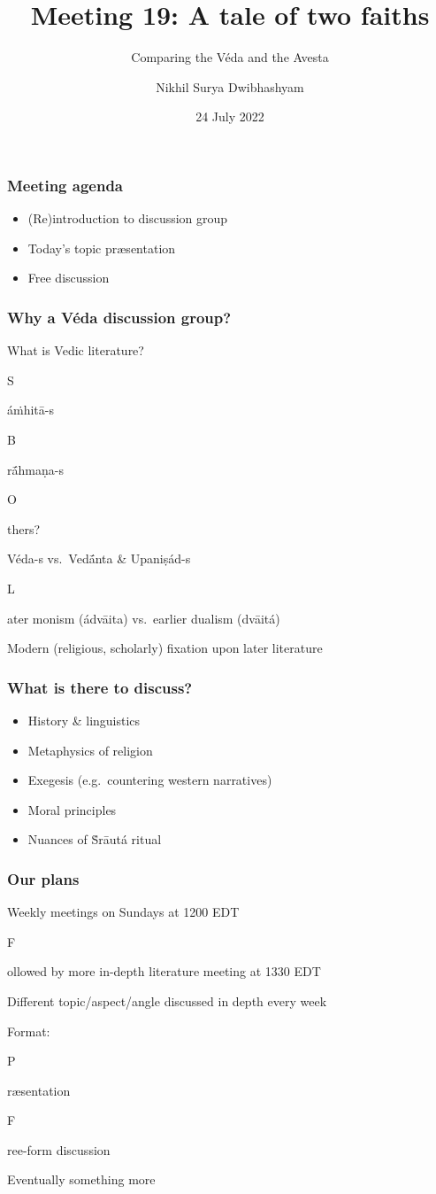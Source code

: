 \documentclass[pdf]{beamer}
\title{Meeting 19: A tale of two faiths}
\subtitle{Comparing the Véda and the Avesta}
\author{Nikhil Surya Dwibhashyam}
\date{24 July 2022}
\newcommand{\Subitem}[1]{{\setlength\itemindent{12pt} \item[-] #1}}
\begin{document}
\frame{\titlepage}

\begin{frame} \frametitle{Meeting agenda}
\begin{itemize}
	\item (Re)introduction to discussion group
	\item Today's topic præsentation
	\item Free discussion
\end{itemize}
\end{frame}

\begin{frame} \frametitle{Why a Véda discussion group?}
\begin{itemize}
	\item What is Vedic literature?
	\Subitem Sáṁhitā-s
	\Subitem Brā́hmaṇa-s
	\Subitem Others?
	\item Véda-s vs.~Vedā́nta \& Upaniṣád-s
	\Subitem Later monism (ádvāita) vs.~earlier dualism (dvāitá)
	\item Modern (religious, scholarly) fixation upon later literature
\end{itemize}
\end{frame}

\begin{frame} \frametitle{What is there to discuss?}
\begin{itemize}
	\item History \& linguistics
	\item Metaphysics of religion
	\item Exegesis (e.g.~countering western narratives)
	\item Moral principles
	\item Nuances of Ṡrāutá ritual
\end{itemize}
\end{frame}

\begin{frame} \frametitle{Our plans}
\begin{itemize}
	\item Weekly meetings on Sundays at 1200 EDT
	\Subitem Followed by more in-depth literature meeting at 1330 EDT
	\item Different topic/aspect/angle discussed in depth every week
	\item Format:
	\Subitem Præsentation
	\Subitem Free-form discussion
	\item Eventually something more
\end{itemize}
\end{frame}
\end{document}

